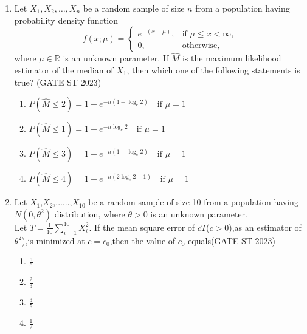 \documentclass[journal]{IEEEtran}
\begin{document}
\begin{enumerate}[label=\textbf{Q.\arabic*.}, start=1, align=left, itemsep=2em]
\begin{enumerate}[label=\textbf{Q.\arabic*.}, start=11, align=left, itemsep=2em]
(II) If $S_5$ denotes the time of the occurence of the 5th event for the above poission process, then $E(S_5 \mid N(5)=3) = 7$.\\

Which of the above statements is/are true?\hfill(GATE ST 2023)
\begin{enumerate}[label=(\Alph*)]
\item Only (I)
\item Only (II)
\item Both (I) and (II)
\item Neither (I) nor (II)
\end{enumerate}

\item Let $X_1, X_2, \dots, X_n$ be a random sample of size $n$ from a population having 
probability density function  
\[
f(x; \mu) = 
\begin{cases} 
e^{-(x-\mu)}, & \text{if } \mu \le x < \infty, \\
0, & \text{otherwise},
\end{cases}
\]
where $\mu \in \mathbb{R}$ is an unknown parameter.  
If $\hat{M}$ is the maximum likelihood estimator of the median of $X_1$,  
then which one of the following statements is true?  \hfill(GATE ST 2023)

\begin{enumerate}[label=(\Alph*)]
    \item $P(\hat{M} \le 2) = 1 - e^{-n(1 - \log_e 2)} \quad \text{if } \mu = 1$
    \item $P(\hat{M} \le 1) = 1 - e^{-n \log_e 2} \quad \text{if } \mu = 1$
    \item $P(\hat{M} \le 3) = 1 - e^{-n(1 - \log_e 2)} \quad \text{if } \mu = 1$
    \item $P(\hat{M} \le 4) = 1 - e^{-n(2\log_e 2 - 1)} \quad \text{if } \mu = 1$
\end{enumerate}


\item Let $X_1$,$X_2$,......,$X_10$ be a random sample of size 10 from a population having $N(0,\theta^2)$ distribution, where $\theta >0$ is an unknown parameter. \\
Let $T = \frac1{10} \sum_{i=1}^{10} X_i^2$. If the mean square error of $cT$($c>0$),as an estimator of $\theta^2$),is minimized at $c=c_0$,then the value of $c_0$ equals\hfill(GATE ST 2023)

\begin{enumerate}[label=(\Alph*)]
\item $\frac{5}{6}$
\item $\frac{2}{3}$
\item $\frac{3}{5}$
\item $\frac{1}{2}$
\end{enumerate}


\end{enumerate}
\end{enumerate}
\end{document}
